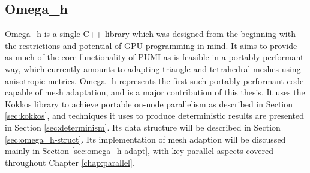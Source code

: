 \subsection{Omega\_h}

Omega\_h is a single C++ library which was designed from the beginning
with the restrictions and potential of GPU programming in mind.
It aims to provide as much of the core functionality of PUMI as
is feasible in a portably performant way, which currently
amounts to adapting triangle and tetrahedral meshes using anisotropic
metrics.
Omega\_h represents the first such portably performant code capable
of mesh adaptation, and is a major contribution of this thesis.
It uses the Kokkos library to achieve portable on-node parallelism
as described in Section \ref{sec:kokkos}, and techniques
it uses to produce deterministic results are presented
in Section \ref{sec:determinism}.
Its data structure will be described in Section \ref{sec:omega_h-struct}.
Its implementation of mesh adaption will be discussed mainly
in Section \ref{sec:omega_h-adapt}, with key parallel aspects
covered throughout Chapter \ref{chap:parallel}.

